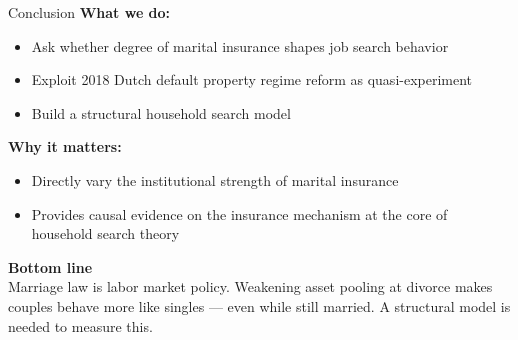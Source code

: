 \documentclass[aspectratio=169, 11pt]{beamer}
\begin{document}
\begin{frame}{Conclusion}
\textbf{What we do:}
\begin{itemize}
  \item Ask whether degree of marital insurance shapes job search behavior
  \item Exploit 2018 Dutch default property regime reform as quasi-experiment
  \item Build a structural household search model 
\end{itemize}
\vspace{0.5em}
\textbf{Why it matters:}
\begin{itemize}
  \item Directly vary the institutional strength of marital insurance
  \item Provides causal evidence on the insurance mechanism at the core of household search theory
\end{itemize}
\vspace{0.8em}
\textbf{Bottom line} \\
\small
Marriage law is labor market policy. Weakening asset pooling at divorce makes couples behave more like singles — even while still married. A structural model is needed to measure this.


\end{frame}



\end{document}
